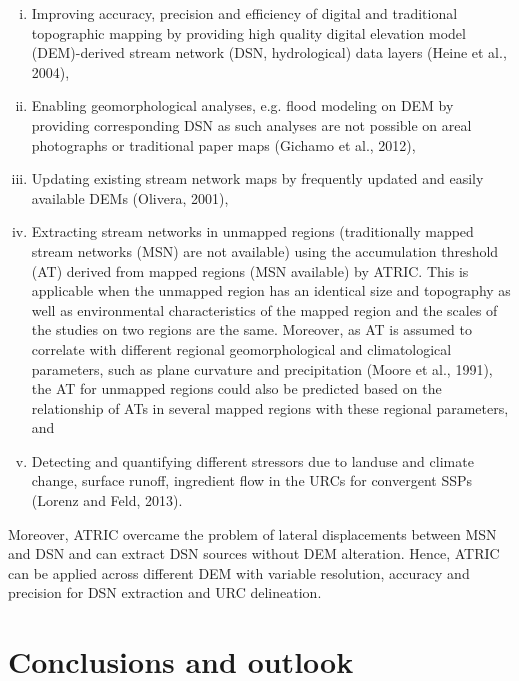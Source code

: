 \begin{enumerate}[(i)]

\item Improving accuracy, precision and efficiency of digital and traditional topographic mapping by providing high quality digital elevation model (DEM)-derived stream network (DSN, hydrological) data layers (Heine et al., 2004),

\item Enabling geomorphological analyses, e.g. flood modeling on DEM by providing corresponding DSN as such analyses are not possible on areal photographs or traditional paper maps (Gichamo et al., 2012),

\item Updating existing stream network maps by frequently updated and easily available DEMs (Olivera, 2001),

\item Extracting stream networks in unmapped regions (traditionally mapped stream networks (MSN) are not available) using the accumulation threshold (AT) derived from mapped regions (MSN available) by ATRIC. This is applicable when the unmapped region has an identical size and topography as well as environmental characteristics of the mapped region and the scales of the studies on two regions are the same. Moreover, as AT is assumed to correlate with different regional geomorphological and climatological parameters, such as plane curvature and precipitation  (Moore et al., 1991), the AT for unmapped regions could also be predicted based on the relationship of ATs in several mapped regions with these regional parameters, and

\item Detecting and quantifying different stressors due to landuse and climate change, surface runoff, ingredient flow in the URCs for convergent SSPs (Lorenz and Feld, 2013).

\end{enumerate}

Moreover, ATRIC overcame the problem of lateral displacements between MSN and DSN and can extract DSN sources without DEM alteration. Hence, ATRIC can be applied across different DEM with variable resolution, accuracy and precision for DSN extraction and URC delineation.

\section{Conclusions and outlook}
\label{Conclusions and outlook}

